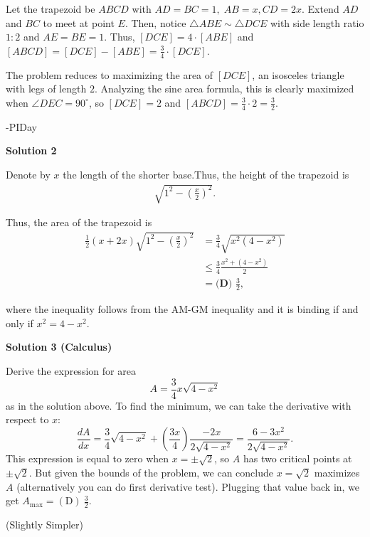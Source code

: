 \begin{enumerate}
Let the trapezoid be $ABCD$ with $AD = BC = 1, \; AB = x, CD = 2x$. Extend $AD$ and $BC$ to meet at point $E$. Then, notice $\triangle ABE \sim \triangle DCE$ with side length ratio $1:2$ and $AE = BE = 1$. Thus, $[DCE] = 4 \cdot [ABE]$ and $[ABCD] = [DCE] - [ABE] = \frac{3}{4} \cdot [DCE]$.

 The problem reduces to maximizing the area of $[DCE]$, an isosceles triangle with legs of length $2$. Analyzing the sine area formula, this is clearly maximized when $\angle DEC = 90^{\circ}$, so $[DCE] = 2$ and $[ABCD] = \frac{3}{4} \cdot 2 = \boxed{\frac{3}{2}}.$

 -PIDay

 



\textbf{Solution 2}

Denote by $x$ the length of the shorter base.Thus, the height of the trapezoid is
 \begin{align*} \sqrt{1^2 - \left( \frac{x}{2} \right)^2} . \end{align*}


 Thus, the area of the trapezoid is
 \begin{align*} \frac{1}{2} \left( x + 2 x \right) \sqrt{1^2 - \left( \frac{x}{2} \right)^2}  & = \frac{3}{4} \sqrt{x^2 \left( 4 - x^2 \right)} \\ & \leq \frac{3}{4} \frac{x^2 + \left( 4 - x^2 \right)}{2} \\ & = \boxed{\textbf{(D) } \frac{3}{2}} , \end{align*}


 where the inequality follows from the AM-GM inequality and it is binding if and only if $x^2 = 4 - x^2$.

 



\textbf{Solution 3 (Calculus)}

Derive the expression for area
 \[A = \frac{3}{4}x\sqrt{4-x^2}\]as in the solution above. To find the minimum, we can take the derivative with respect to $x$:
 \[\frac{dA}{dx} = \frac{3}{4}\sqrt{4-x^2}+\left(\frac{3x}{4}\right)\frac{-2x}{2\sqrt{4-x^2}} = \frac{6-3x^2}{2\sqrt{4-x^2}}.\]This expression is equal to zero when $x=\pm\sqrt{2}$, so $A$ has two critical points at $\pm\sqrt{2}$. But given the bounds of the problem, we can conclude $x = \sqrt{2}$ maximizes $A$ (alternatively you can do first derivative test). Plugging that value back in, we get $A_{\text{max}} = \boxed{(\text{D})\ \frac{3}{2}}$.

 (Slightly Simpler)


\end{enumerate}
